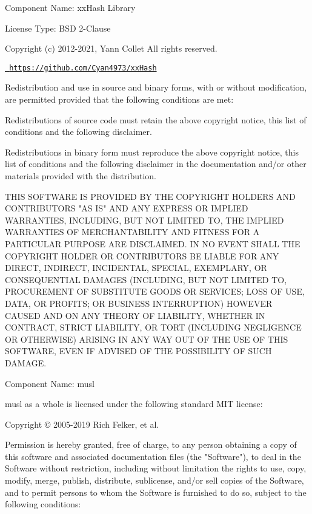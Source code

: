  Component Name\+: xx\+Hash Library

License Type\+: BSD 2-\/Clause

Copyright (c) 2012-\/2021, Yann Collet All rights reserved.

\href{https://github.com/Cyan4973/xxHash}{\texttt{ https\+://github.\+com/\+Cyan4973/xx\+Hash}}

Redistribution and use in source and binary forms, with or without modification, are permitted provided that the following conditions are met\+:


\begin{DoxyItemize}
\item Redistributions of source code must retain the above copyright notice, this list of conditions and the following disclaimer.
\item Redistributions in binary form must reproduce the above copyright notice, this list of conditions and the following disclaimer in the documentation and/or other materials provided with the distribution.
\end{DoxyItemize}

THIS SOFTWARE IS PROVIDED BY THE COPYRIGHT HOLDERS AND CONTRIBUTORS "{}\+AS IS"{} AND ANY EXPRESS OR IMPLIED WARRANTIES, INCLUDING, BUT NOT LIMITED TO, THE IMPLIED WARRANTIES OF MERCHANTABILITY AND FITNESS FOR A PARTICULAR PURPOSE ARE DISCLAIMED. IN NO EVENT SHALL THE COPYRIGHT HOLDER OR CONTRIBUTORS BE LIABLE FOR ANY DIRECT, INDIRECT, INCIDENTAL, SPECIAL, EXEMPLARY, OR CONSEQUENTIAL DAMAGES (INCLUDING, BUT NOT LIMITED TO, PROCUREMENT OF SUBSTITUTE GOODS OR SERVICES; LOSS OF USE, DATA, OR PROFITS; OR BUSINESS INTERRUPTION) HOWEVER CAUSED AND ON ANY THEORY OF LIABILITY, WHETHER IN CONTRACT, STRICT LIABILITY, OR TORT (INCLUDING NEGLIGENCE OR OTHERWISE) ARISING IN ANY WAY OUT OF THE USE OF THIS SOFTWARE, EVEN IF ADVISED OF THE POSSIBILITY OF SUCH DAMAGE.

 Component Name\+: musl

musl as a whole is licensed under the following standard MIT license\+:

Copyright © 2005-\/2019 Rich Felker, et al.

Permission is hereby granted, free of charge, to any person obtaining a copy of this software and associated documentation files (the "{}\+Software"{}), to deal in the Software without restriction, including without limitation the rights to use, copy, modify, merge, publish, distribute, sublicense, and/or sell copies of the Software, and to permit persons to whom the Software is furnished to do so, subject to the following conditions\+:

